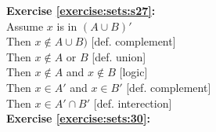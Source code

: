 \noindent\textbf{Exercise \ref{exercise:sets:s27}:}\\ %
Assume $x$ is in $(A\cup B)'$\\
Then $x \notin A \cup B)$ [def. complement]\\
Then $x \notin A$ or $B$ [def. union]\\
Then $x \notin A$ and $x \notin B$ [logic]\\
Then $x \in A'$ and $x \in B'$ [def. complement]\\
Then $x \in A' \cap B'$ [def. interection]\\

\noindent\textbf{Exercise \ref{exercise:sets:30}:}%


